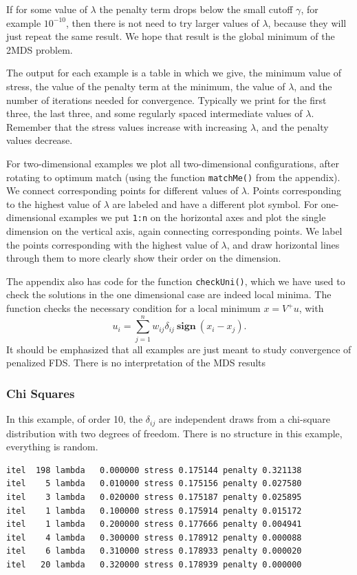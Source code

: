 \documentclass[
  12pt,
  letterpaper,
  DIV=11,
  numbers=noendperiod]{scrreprt}
\theoremstyle{remark}
\begin{document}
If for some value of \(\lambda\) the penalty term drops below the small
cutoff \(\gamma\), for example \ensuremath{10^{-10}}, then there is not
need to try larger values of \(\lambda\), because they will just repeat
the same result. We hope that result is the global minimum of the 2MDS
problem.

The output for each example is a table in which we give, the minimum
value of stress, the value of the penalty term at the minimum, the value
of \(\lambda\), and the number of iterations needed for convergence.
Typically we print for the first three, the last three, and some
regularly spaced intermediate values of \(\lambda\). Remember that the
stress values increase with increasing \(\lambda\), and the penalty
values decrease.

For two-dimensional examples we plot all two-dimensional configurations,
after rotating to optimum match (using the function \texttt{matchMe()}
from the appendix). We connect corresponding points for different values
of \(\lambda\). Points corresponding to the highest value of \(\lambda\)
are labeled and have a different plot symbol. For one-dimensional
examples we put \texttt{1:n} on the horizontal axes and plot the single
dimension on the vertical axis, again connecting corresponding points.
We label the points corresponding with the highest value of \(\lambda\),
and draw horizontal lines through them to more clearly show their order
on the dimension.

The appendix also has code for the function \texttt{checkUni()}, which
we have used to check the solutions in the one dimensional case are
indeed local minima. The function checks the necessary condition for a
local minimum \(x=V^+u\), with \[
u_i=\sum_{j=1}^nw_{ij}\delta_{ij}\ \mathbf{sign}\ (x_i-x_j).
\] It should be emphasized that all examples are just meant to study
convergence of penalized FDS. There is no interpretation of the MDS
results

\subsubsection{Chi Squares}\label{chi-squares}

In this example, of order 10, the \(\delta_{ij}\) are independent draws
from a chi-square distribution with two degrees of freedom. There is no
structure in this example, everything is random.

\begin{verbatim}
itel  198 lambda   0.000000 stress 0.175144 penalty 0.321138 
itel    5 lambda   0.010000 stress 0.175156 penalty 0.027580 
itel    3 lambda   0.020000 stress 0.175187 penalty 0.025895 
itel    1 lambda   0.100000 stress 0.175914 penalty 0.015172 
itel    1 lambda   0.200000 stress 0.177666 penalty 0.004941 
itel    4 lambda   0.300000 stress 0.178912 penalty 0.000088 
itel    6 lambda   0.310000 stress 0.178933 penalty 0.000020 
itel   20 lambda   0.320000 stress 0.178939 penalty 0.000000 
\end{verbatim}
\end{document}
